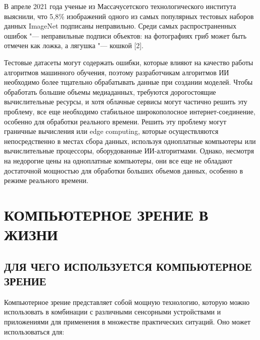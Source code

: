 \documentclass[bachelor, och, referat, times]{SCWorks}
\begin{document}
В апреле 2021 года ученые из Массачусетского технологического института выяснили, что 5,8\% изображений одного из самых популярных тестовых наборов данных ImageNet подписаны неправильно. Среди самых распространенных ошибок "--- неправильные подписи объектов: на фотографиях гриб может быть отмечен как ложка, а лягушка "--- кошкой [2].

Тестовые датасеты могут содержать ошибки, которые влияют на качество работы алгоритмов машинного обучения, поэтому разработчикам алгоритмов ИИ необходимо более тщательно обрабатывать данные при создании моделей. Чтобы обработать большие объемы медиаданных, требуются дорогостоящие вычислительные ресурсы, и хотя облачные сервисы могут частично решить эту проблему, все еще необходимо стабильное широкополосное интернет-соединение, особенно для обработки реального времени. Решить эту проблему могут граничные вычисления или edge computing, которые осуществляются непосредственно в местах сбора данных, используя одноплатные компьютеры или вычислительные процессоры, оборудованные ИИ-алгоритмами. Однако, несмотря на недорогие цены на одноплатные компьютеры, они все еще не обладают достаточной мощностью для обработки больших объемов данных, особенно в режиме реального времени. 

\section{КОМПЬЮТЕРНОЕ ЗРЕНИЕ В ЖИЗНИ}
\subsection{ДЛЯ ЧЕГО ИСПОЛЬЗУЕТСЯ КОМПЬЮТЕРНОЕ ЗРЕНИЕ}
Компьютерное зрение представляет собой мощную технологию, которую можно использовать в комбинации с различными сенсорными устройствами и приложениями для применения в множестве практических ситуаций. Оно может использоваться для:
\end{document}
